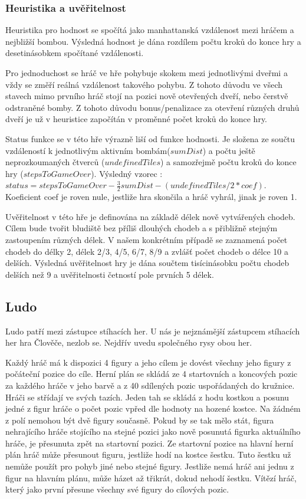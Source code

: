 \subsubsection{Heuristika a uvěřitelnost}

Heuristika pro hodnost se spočítá jako manhattanská vzdálenost mezi hráčem a nejbližší bombou. Výsledná hodnost je dána rozdílem počtu kroků do konce hry a desetinásobkem spočítané vzdálenosti.

Pro jednoduchost se hráč ve hře pohybuje skokem mezi jednotlivými dveřmi a vždy se změří reálná vzdálenost takového pohybu. Z tohoto důvodu ve všech stavech mimo prvního hráč stojí na pozici nově otevřených dveří, nebo čerstvě odstraněné bomby. Z tohoto důvodu bonus/penalizace za otevření různých druhů dveří je už v heuristice započítán v proměnné počet kroků do konce hry.

Status funkce se v této hře výrazně liší od funkce hodnosti. Je složena ze součtu vzdáleností k jednotlivým aktivním bombám($sumDist$) a počtu ještě neprozkoumaných čtverců ($undefinedTiles$) a samozřejmě počtu kroků do konce hry ($stepsToGameOver$). Výsledný vzorec : $status = stepsToGameOver - \frac{3}{2}sumDist-(undefinedTiles / 2 * coef)$. Koeficient coef je roven nule, jestliže hra skončila a hráč vyhrál, jinak je roven 1. 

Uvěřitelnost v této hře je definována na základě délek nově vytvářených chodeb. Cílem bude tvořit bludiště bez příliš dlouhých chodeb a s přibližně stejným zastoupením různých délek. V našem konkrétním případě se zaznamená počet chodeb do délky 2, délek 2/3, 4/5, 6/7, 8/9 a zvlášť počet chodeb o délce 10 a delších. Výsledná uvěřitelnost hry je dána součtem tisícinásobku počtu chodeb delších než 9 a uvěřitelnosti četností pole prvních 5 délek.

\subsection{Ludo}

Ludo patří mezi zástupce stíhacích her. U nás je nejznámější zástupcem stíhacích her hra Člověče, nezlob se. Nejdřív uvedu společného rysy obou her. 

Každý hráč má k dispozici 4 figury a jeho cílem je dovést všechny jeho figury z počáteční pozice do cíle. Herní plán se skládá ze 4 startovních a koncových pozic za každého hráče v jeho barvě a z 40 sdílených pozic uspořádaných do kružnice. Hráči se střídají ve svých tazích. Jeden tah se skládá z hodu kostkou a posunu jedné z figur hráče o počet pozic vpřed dle hodnoty na hozené kostce. Na žádném z polí nemohou být dvě figury současně. Pokud by se tak mělo stát, figura nehrajícího hráče stojícího na stejné pozici jako nově posunutá figurka aktuálního hráče, je přesunuta zpět na startovní pozici. Ze startovní pozice na hlavní herní plán hráč může přesunout figuru, jestliže hodí na kostce šestku. Tuto šestku už nemůže použít pro pohyb jiné nebo stejné figury. Jestliže nemá hráč ani jednu z figur na hlavním plánu, může házet až třikrát, dokud nehodí šestku. Vítězí hráč, který jako první přesune všechny své figury do cílových pozic.

